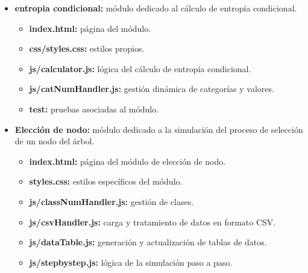 \begin{itemize}
\begin{itemize}
        \item \textbf{entropia condicional:} módulo dedicado al cálculo de entropía condicional.
        \begin{itemize}
            \item \textbf{index.html:} página del módulo.
            \item \textbf{css/styles.css:} estilos propios.
            \item \textbf{js/calculator.js:} lógica del cálculo de entropía condicional.
            \item \textbf{js/catNumHandler.js:} gestión dinámica de categorías y valores.
            \item \textbf{test:} pruebas asociadas al módulo.
        \end{itemize}

        \item \textbf{Elección de nodo:} módulo dedicado a la simulación del proceso de selección de un nodo del árbol.
        \begin{itemize}
            \item \textbf{index.html:} página del módulo de elección de nodo.
            \item \textbf{styles.css:} estilos específicos del módulo.
            \item \textbf{js/classNumHandler.js:} gestión de clases.
            \item \textbf{js/csvHandler.js:} carga y tratamiento de datos en formato CSV.
            \item \textbf{js/dataTable.js:} generación y actualización de tablas de datos.
            \item \textbf{js/stepbystep.js:} lógica de la simulación paso a paso.
        \end{itemize}


\end{itemize}
\end{itemize}
